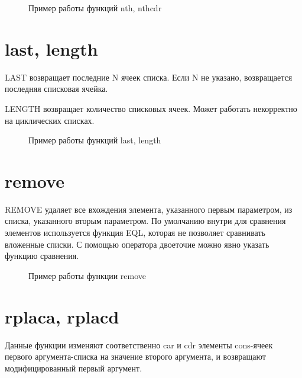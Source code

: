 \begin{figure}[H]
    \begin{listingbox}{}
        
    \end{listingbox}
    \caption{Пример работы функций nth, nthcdr}
    \label{lst:nth-nthcdr-example}
\end{figure}

\section{last, length}

LAST возвращает последние N ячеек списка. Если N не указано,
возвращается последняя списковая ячейка.

LENGTH возвращает количество списковых ячеек. Может работать 
некорректно на циклических списках.

\begin{figure}[H]
    \begin{listingbox}{}
        
    \end{listingbox}
    \caption{Пример работы функций last, length}
    \label{lst:last-length-example}
\end{figure}

\section{remove}

REMOVE удаляет все вхождения элемента, указанного первым
параметром, из списка, указанного вторым параметром. По умолчанию
внутри для сравнения элементов используется функция EQL, которая 
не позволяет сравнивать вложенные списки. С помощью оператора 
двоеточие можно явно указать функцию сравнения.

\begin{figure}[H]
    \begin{listingbox}{}
        
    \end{listingbox}
    \caption{Пример работы функции remove}
    \label{lst:remove-example}
\end{figure}

\section{rplaca, rplacd}

Данные функции изменяют соответственно car и cdr элементы 
cons-ячеек первого аргумента-списка на значение второго аргумента,
и возвращают модифицированный первый аргумент.

